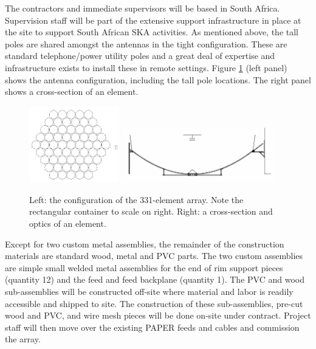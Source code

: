 \documentclass[preprint]{aastex}
\begin{document}
The contractors and immediate supervisors will be based in South Africa.  Supervision staff 
will be part of the extensive support infrastructure in place at the site to support South African SKA activities.
As mentioned above, the tall poles are shared amongst the antennas in the tight configuration.  
These are standard telephone/power 
utility poles and a great deal of  expertise and infrastructure exists to install these in remote settings.  
Figure \ref{fig:config_optics} (left panel) shows the antenna configuration, including the tall pole locations.
The right panel shows a cross-section of an element.

\begin{figure}[h]
	\centering
		\includegraphics[width=0.35\textwidth]{plots/Engineering/hex_61.png} %
		\includegraphics[width=0.6\textwidth]{plots/Engineering/optics.png}
\caption{Left: the configuration of the 331-element array.  Note the rectangular container to scale on right.
		Right: a cross-section and optics of an element.}
	\label{fig:config_optics}
\end{figure}

Except for two custom metal assemblies, the remainder of the construction materials are standard wood, 
metal and PVC parts.  The two custom assemblies are simple small welded metal assemblies for the end of 
rim support pieces (quantity 12) and the feed and feed backplane (quantity 1).  The PVC and wood sub-assemblies 
will be constructed off-site where material and labor is readily accessible and shipped to site.  The 
construction of these sub-assemblies, pre-cut wood and PVC, and wire mesh pieces will be done on-site under 
contract.  Project staff will then move over the existing PAPER feeds and cables and commission the array.  
\end{document}
